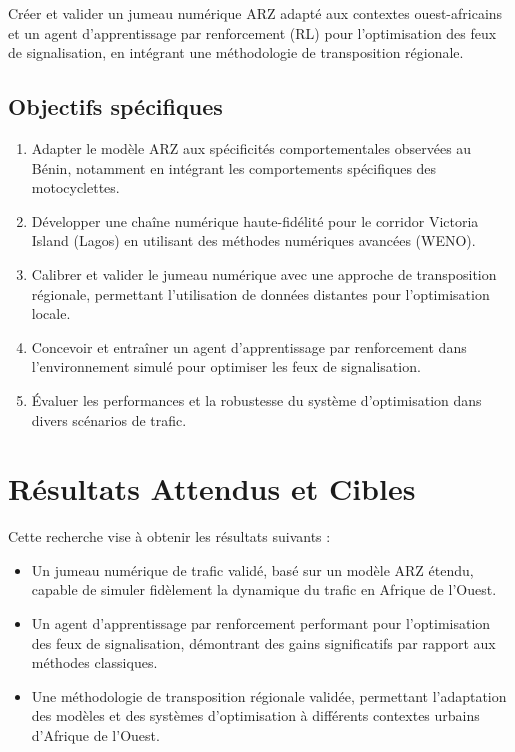Créer et valider un jumeau numérique ARZ adapté aux contextes ouest-africains et un agent d'apprentissage par renforcement (RL) pour l'optimisation des feux de signalisation, en intégrant une méthodologie de transposition régionale.

\subsection{Objectifs spécifiques}
\label{subsec:objectifs_specifiques}

\begin{enumerate}
    \item Adapter le modèle ARZ aux spécificités comportementales observées au Bénin, notamment en intégrant les comportements spécifiques des motocyclettes.
    \item Développer une chaîne numérique haute-fidélité pour le corridor Victoria Island (Lagos) en utilisant des méthodes numériques avancées (WENO).
    \item Calibrer et valider le jumeau numérique avec une approche de transposition régionale, permettant l'utilisation de données distantes pour l'optimisation locale.
    \item Concevoir et entraîner un agent d'apprentissage par renforcement dans l'environnement simulé pour optimiser les feux de signalisation.
    \item Évaluer les performances et la robustesse du système d'optimisation dans divers scénarios de trafic.
\end{enumerate}

\section{Résultats Attendus et Cibles}
\label{sec:resultats_attendus}

Cette recherche vise à obtenir les résultats suivants :
\begin{itemize}
    \item Un jumeau numérique de trafic validé, basé sur un modèle ARZ étendu, capable de simuler fidèlement la dynamique du trafic en Afrique de l'Ouest.
    \item Un agent d'apprentissage par renforcement performant pour l'optimisation des feux de signalisation, démontrant des gains significatifs par rapport aux méthodes classiques.
    \item Une méthodologie de transposition régionale validée, permettant l'adaptation des modèles et des systèmes d'optimisation à différents contextes urbains d'Afrique de l'Ouest.
\end{itemize}

